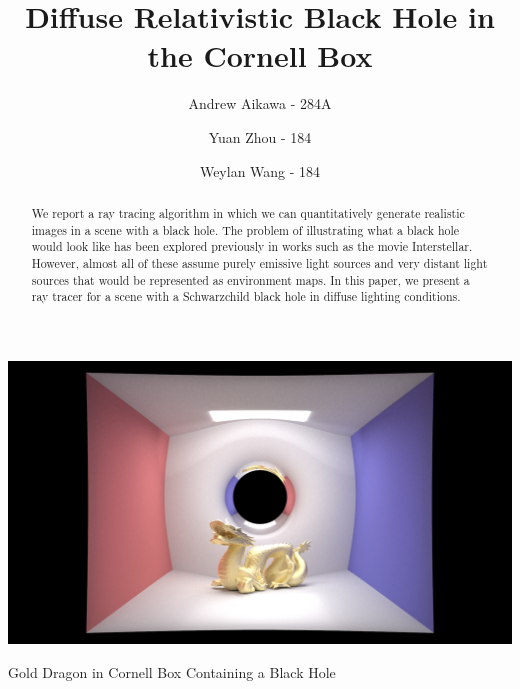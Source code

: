 \documentclass[sigconf]{acmart}
\begin{document}
%
\title{Diffuse Relativistic Black Hole in the Cornell Box}

%
\author{Andrew Aikawa - 284A}

\author{Yuan Zhou - 184}

\author{Weylan Wang - 184}

\begin{abstract}
We report a ray tracing algorithm in which we can quantitatively generate realistic images in a scene with a black hole.  The problem of illustrating what a black hole would look like has been explored previously in works such as the movie Interstellar\cite{james_tunzelmann_franklin_thorne_2015}. However, almost all of these assume purely emissive light sources and very distant light sources that would be represented as environment maps.  In this paper, we present a ray tracer for a scene with a Schwarzchild black hole in diffuse lighting conditions.
\end{abstract}


%

%
\begin{teaserfigure}
  \includegraphics[width=\textwidth]{dragon.png}
  \caption{Gold Dragon in Cornell Box Containing a Black Hole}
  \label{fig:teaser}
\end{teaserfigure}
\end{document}
